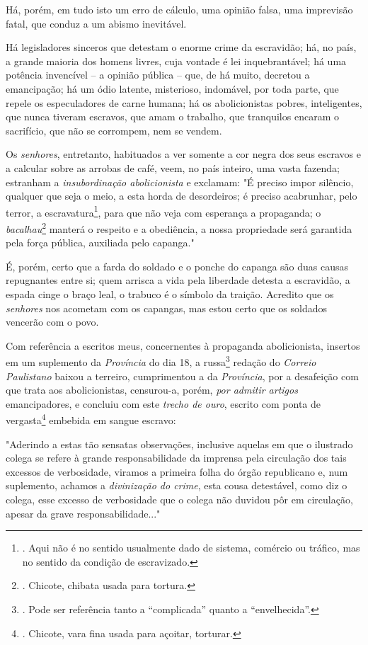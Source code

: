 Há, porém, em tudo isto um erro de cálculo, uma opinião falsa, uma
imprevisão fatal, que conduz a um abismo inevitável.

Há legisladores sinceros que detestam o enorme crime da escravidão; há,
no país, a grande maioria dos homens livres, cuja vontade é lei
inquebrantável; há uma potência invencível -- a opinião pública -- que,
de há muito, decretou a emancipação; há um ódio latente, misterioso,
indomável, por toda parte, que repele os especuladores de carne humana;
há os abolicionistas pobres, inteligentes, que nunca tiveram escravos,
que amam o trabalho, que tranquilos encaram o sacrifício, que não se
corrompem, nem se vendem.

Os \emph{senhores}, entretanto, habituados a ver somente a cor negra dos
seus escravos e a calcular sobre as arrobas de café, veem, no país
inteiro, uma vasta fazenda; estranham a \emph{insubordinação
abolicionista} e exclamam: "É preciso impor silêncio, qualquer que seja
o meio, a esta horda de desordeiros; é preciso acabrunhar, pelo terror,
a escravatura\footnote{. Aqui não é no sentido usualmente dado de
  sistema, comércio ou tráfico, mas no sentido da condição de
  escravizado.}, para que não veja com esperança a propaganda; o
\emph{bacalhau}\footnote{. Chicote, chibata usada para tortura.} manterá
o respeito e a obediência, a nossa propriedade será garantida pela força
pública, auxiliada pelo capanga."

É, porém, certo que a farda do soldado e o ponche do capanga são duas
causas repugnantes entre si; quem arrisca a vida pela liberdade detesta
a escravidão, a espada cinge o braço leal, o trabuco é o símbolo da
traição. Acredito que os \emph{senhores} nos acometam com os capangas,
mas estou certo que os soldados vencerão com o povo.

Com referência a escritos meus, concernentes à propaganda abolicionista,
insertos em um suplemento da \emph{Província} do dia 18, a
russa\footnote{. Pode ser referência tanto a ``complicada'' quanto a
  ``envelhecida''.} redação do \emph{Correio Paulistano} baixou a
terreiro, cumprimentou a da \emph{Província}, por a desafeição com que
trata aos abolicionistas, censurou-a, porém, \emph{por admitir artigos}
emancipadores, e concluiu com este \emph{trecho de ouro}, escrito com
ponta de vergasta\footnote{. Chicote, vara fina usada para açoitar,
  torturar.} embebida em sangue escravo:

"Aderindo a estas tão sensatas observações, inclusive aquelas em que o
ilustrado colega se refere à grande responsabilidade da imprensa pela
circulação dos tais excessos de verbosidade, viramos a primeira folha do
órgão republicano e, num suplemento, achamos a \emph{divinização do
crime}, esta cousa detestável, como diz o colega, esse excesso de
verbosidade que o colega não duvidou pôr em circulação, apesar da grave
responsabilidade..."

